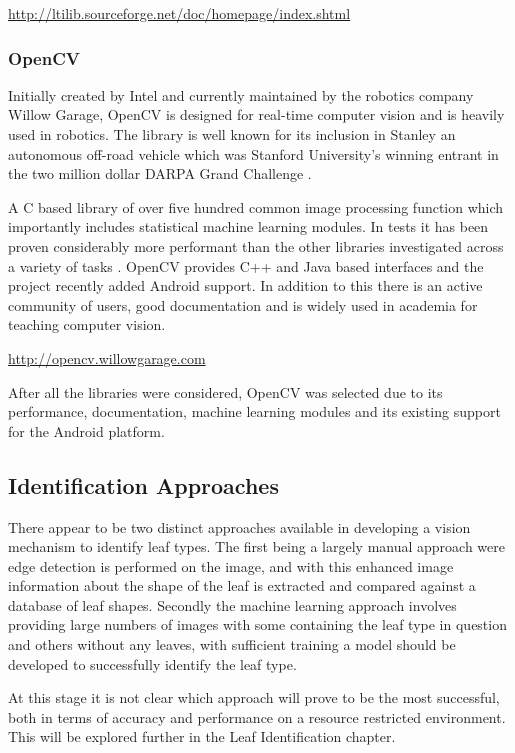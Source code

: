 \url{http://ltilib.sourceforge.net/doc/homepage/index.shtml}


\subsubsection{OpenCV}
Initially created by Intel and currently maintained by the robotics company Willow Garage, OpenCV is designed for real-time computer vision and is heavily used in robotics. The library is well known for its inclusion in Stanley an autonomous off-road vehicle which was Stanford University's winning entrant in the two million dollar DARPA Grand Challenge \cite{openCV11}. 

A C based library of over five hundred common image processing function which importantly includes statistical machine learning modules. In tests it has been proven considerably more performant than the other libraries investigated across a variety of tasks \cite{utkarsh10}. OpenCV provides C++ and Java based interfaces and the project recently added Android support. In addition to this there is an active community of users, good documentation and is widely used in academia for teaching computer vision.

\url{http://opencv.willowgarage.com}

After all the libraries were considered, OpenCV was selected due to its performance, documentation, machine learning modules and its existing support for the Android platform.

\subsection{Identification Approaches}

There appear to be two distinct approaches available in developing a vision mechanism to identify leaf types. The first being a largely manual approach were edge detection is performed on the image, and with this enhanced image information about the shape of the leaf is extracted and compared against a database of leaf shapes. Secondly the machine learning approach involves providing large numbers of images with some containing the leaf type in question and others without any leaves, with sufficient training a model should be developed to successfully identify the leaf type.

At this stage it is not clear which approach will prove to be the most successful, both in terms of accuracy and performance on a resource restricted environment. This will be explored further in the Leaf Identification chapter.

